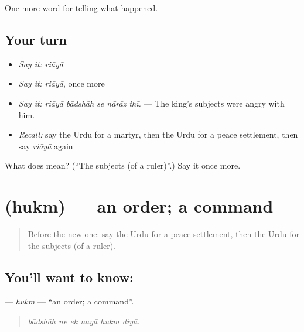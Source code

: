 \begin{grammarlens}[title={What you've built}]
One more word for telling what happened.
\end{grammarlens}

\subsection*{Your turn}
\begin{itemize}
\raggedright
  \item \emph{Say it:} \emph{riāyā}
  \item \emph{Say it:} \emph{riāyā}, once more
  \item \emph{Say it:} \emph{riāyā bādshāh se nārāz thī.} — The king's subjects were angry with him.
  \item \emph{Recall:} say the Urdu for a martyr, then the Urdu for a peace settlement, then say \emph{riāyā} again
\end{itemize}

\begin{tcolorbox}[breakable,colback=teal!4,colframe=teal!35!black,title={Before you move on}]
What does  mean? (\textquotedblleft{}The subjects (of a ruler)\textquotedblright{}.) Say it once more.
\end{tcolorbox}
\section[\texorpdfstring{\ur{حکم} (hukm)}{حکم (hukm)}]{ (hukm) — an order; a command}

\label{lesson:UR-C312-hukm}



\begin{quote}
Before the new one: say the Urdu for a peace settlement, then the Urdu for the subjects (of a ruler).
\end{quote}

\subsection*{You'll want to know: }
\textbf{} — \emph{hukm} — \textquotedblleft{}an order; a command\textquotedblright{}.

\begin{quote}
     
\end{quote}

\begin{quote}
\emph{bādshāh ne ek nayā hukm diyā.}
\end{quote}

